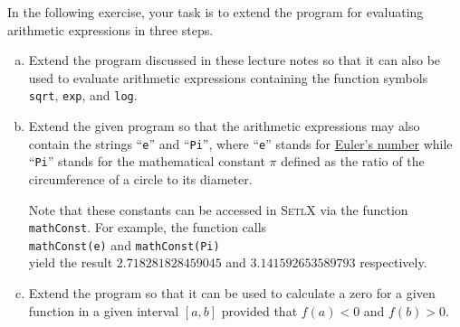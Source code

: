 \exercise
In the following exercise, your task is to extend the program for evaluating arithmetic expressions in three steps.
\begin{enumerate}[(a)]
\item Extend the program discussed in these lecture notes so that it can also be used to evaluate
      arithmetic expressions containing the function symbols
      \\[0.2cm]
      \hspace*{1.3cm}
      \texttt{sqrt}, \texttt{exp}, and \texttt{log}.
\item Extend the given program so that the arithmetic expressions may also contain 
      the strings ``\texttt{e}'' and ``\texttt{Pi}'', where ``\texttt{e}'' stands for 
      \href{http://en.wikipedia.org/wiki/E_(mathematical_constant)}{Euler's number} 
      while ``\texttt{Pi}'' stands for the mathematical constant
      \href{http://en.wikipedia.org/wiki/Pi}{$\pi$} defined as the ratio of the circumference of a
      circle to its diameter. 

      Note that these constants can be accessed in \textsc{SetlX} via the function \texttt{mathConst}.
      For example, the function calls
      \\[0.2cm]
      \hspace*{1.3cm}
      \texttt{mathConst(e)} \quad and \quad
      \texttt{mathConst(Pi)} 
      \\[0.2cm]
      yield the result $2.718281828459045$ and $3.141592653589793$ respectively.
\item Extend the program so that it can be used to calculate a zero for a given function in a given
      interval $[a,b]$ provided that $f(a) < 0$ and $f(b) > 0$.  
      \eox
\end{enumerate}



